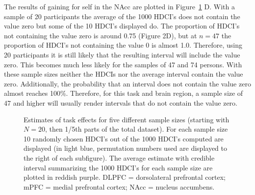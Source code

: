 \documentclass[
  letterpaper,
  DIV=11,
  numbers=noendperiod]{scrartcl}
\begin{document}
The results of gaining for self in the NAcc are plotted in
Figure~\ref{fig-1} D. With a sample of 20 participants the average of
the 1000 HDCI's does not contain the value zero but some of the 10
HDCI's displayed do. The proportion of HDCI's not containing the value
zero is around 0.75 (Figure 2D), but at \(n = 47\) the proportion of
HDCI's not containing the value 0 is almost 1.0. Therefore, using 20
participants it is still likely that the resulting interval will include
the value zero. This becomes much less likely for the samples of 47 and
74 persons. With these sample sizes neither the HDCIs nor the average
interval contain the value zero. Additionally, the probability that an
interval does not contain the value zero almost reaches 100\%.
Therefore, for this task and brain region, a sample size of 47 and
higher will usually render intervals that do not contain the value zero.

\begin{figure}


\caption{\label{fig-1}Estimates of task effects for five different
sample sizes (starting with \(N=20\), then 1/5th parts of the total
dataset). For each sample size 10 randomly chosen HDCI's out of the 1000
HDCI's computed are displayed (in light blue, permutation numbers used
are displayed to the right of each subfigure). The average estimate with
credible interval summarizing the 1000 HDCI's for each sample size are
plotted in reddish purple. DLPFC = dorsolateral prefrontal cortex; mPFC
= medial prefrontal cortex; NAcc = nucleus accumbens.}

\end{figure}%
\end{document}
